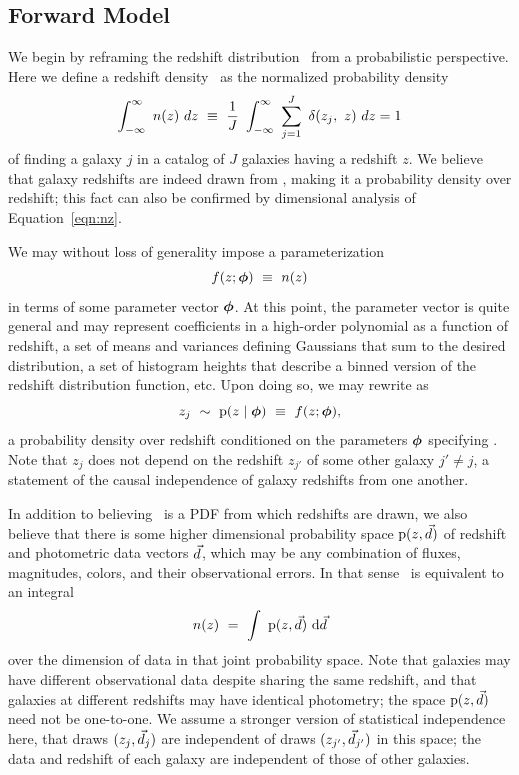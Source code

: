 \subsection{Forward Model}

We begin by reframing the redshift distribution \nz\ from a probabilistic perspective.
Here we define a redshift density \nz\ as the normalized probability density
\begin{equation}
\eqlabel{eqn:nz}
\int_{-\infty}^{\infty}\ n(z)\ dz\ \equiv\ \frac{1}{J}\ \int_{-\infty}^{\infty}\ \sum_{j=1}^{J}\ \delta(z_{j},\ z)\ dz = 1
\end{equation}
of finding a galaxy $j$ in a catalog of $J$ galaxies having a redshift $z$.
We believe that galaxy redshifts are indeed drawn from \nz, making it a probability density over redshift; this fact can also be confirmed by dimensional analysis of Equation~\ref{eqn:nz}.

We may without loss of generality impose a parameterization
\begin{equation}
\eqlabel{eqn:fz}
f(z; \ndphi)\ \equiv\ n(z)
\end{equation}
in terms of some parameter vector ${\boldsymbol{\phi}}$.
At this point, the parameter vector is quite general and may represent coefficients in a high-order polynomial as a function of redshift, a set of means and variances defining Gaussians that sum to the desired distribution, a set of histogram heights that describe a binned version of the redshift distribution function, etc.
Upon doing so, we may rewrite  as 
\begin{equation}
\eqlabel{eqn:pz}
z_{j}\ \sim\ \pr{z \gvn \ndphi}\ \equiv\ f(z; \ndphi),
\end{equation}
a probability density over redshift conditioned on the parameters ${\boldsymbol{\phi}}$ specifying \nz.
Note that $z_{j}$ does not depend on the redshift $z_{j'}$ of some other galaxy $j' \neq j$, a statement of the causal independence of galaxy redshifts from one another.

In addition to believing \nz\ is a PDF from which redshifts are drawn, we also believe that there is some higher dimensional probability space $\mathrm{p}(z, \vec{d})$ of redshift and photometric data vectors $\vec{d}$, which may be any combination of fluxes, magnitudes, colors, and their observational errors.
In that sense \nz\ is equivalent to an integral
\begin{equation}
\label{eqn:integral}
n(z)\ =\ \int\ \mathrm{p}(z, \vec{d})\ \mathrm{d} \vec{d}
\end{equation}
over the dimension of data in that joint probability space.
Note that galaxies may have different observational data despite sharing the same redshift, and that galaxies at different redshifts may have identical photometry; the space $\mathrm{p}(z, \vec{d})$ need not be one-to-one.
We assume a stronger version of statistical independence here, that draws $(z_{j}, \vec{d}_{j})$ are independent of draws $(z_{j'}, \vec{d}_{j'})$ in this space; the data and redshift of each galaxy are independent of those of other galaxies.

